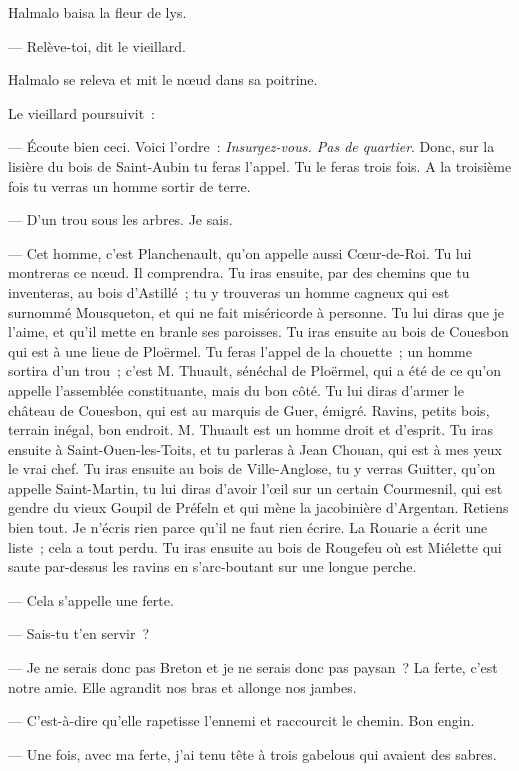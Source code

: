 \documentclass[french,twoside]{book} %
\begin{document}
Halmalo baisa la fleur de lys.\par
— Relève-toi, dit le vieillard.\par
Halmalo se releva et mit le nœud dans sa poitrine.\par
Le vieillard poursuivit :\par
— Écoute bien ceci. Voici l’ordre : \emph{Insurgez-vous. Pas de quartier}. Donc, sur la lisière du bois de Saint-Aubin tu feras l’appel. Tu le feras trois fois. A la troisième fois tu verras un homme sortir de terre.\par
— D’un trou sous les arbres. Je sais.\par
— Cet homme, c’est Planchenault, qu’on appelle aussi Cœur-de-Roi. Tu lui montreras ce nœud. Il comprendra. Tu iras ensuite, par des chemins que tu inventeras, au bois d’Astillé ; tu y trouveras un homme cagneux qui est surnommé Mousqueton, et  qui ne fait miséricorde à personne. Tu lui diras que je l’aime, et qu’il mette en branle ses paroisses. Tu iras ensuite au bois de Couesbon qui est à une lieue de Ploërmel. Tu feras l’appel de la chouette ; un homme sortira d’un trou ; c’est M. Thuault, sénéchal de Ploërmel, qui a été de ce qu’on appelle l’assemblée constituante, mais du bon côté. Tu lui diras d’armer le château de Couesbon, qui est au marquis de Guer, émigré. Ravins, petits bois, terrain inégal, bon endroit. M. Thuault est un homme droit et d’esprit. Tu iras ensuite à Saint-Ouen-les-Toits, et tu parleras à Jean Chouan, qui est à mes yeux le vrai chef. Tu iras ensuite au bois de Ville-Anglose, tu y verras Guitter, qu’on appelle Saint-Martin, tu lui diras d’avoir l’œil sur un certain Courmesnil, qui est gendre du vieux Goupil de Préfeln et qui mène la jacobinière d’Argentan. Retiens bien tout. Je n’écris rien parce qu’il ne faut rien écrire. La Rouarie a écrit une liste ; cela a tout perdu. Tu iras ensuite au bois de Rougefeu où est Miélette qui saute par-dessus les ravins en s’arc-boutant sur une longue perche.\par
— Cela s’appelle une ferte.\par
— Sais-tu t’en servir ?\par
— Je ne serais donc pas Breton et je ne serais donc pas paysan ? La ferte, c’est notre amie. Elle agrandit nos bras et allonge nos jambes.\par
— C’est-à-dire qu’elle rapetisse l’ennemi et raccourcit le chemin. Bon engin.\par
— Une fois, avec ma ferte, j’ai tenu tête à trois gabelous qui avaient des sabres.\par
\end{document}
